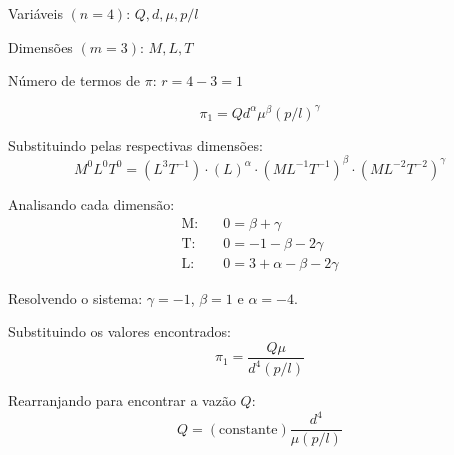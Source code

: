 Variáveis $(n=4)$: $Q, d, \mu, p/l$

Dimensões $(m=3)$: $M, L, T$

Número de termos de $\pi$: $r = 4 - 3 = 1$

\[ \pi_1 = Q d^\alpha \mu^\beta (p/l)^\gamma \]

Substituindo pelas respectivas dimensões:
\[ M^{0}L^{0}T^{0} = (L^{3}T^{-1}) \cdot (L)^{\alpha} \cdot (M L^{-1}T^{-1})^{\beta} \cdot (M L^{-2}T^{-2})^\gamma \]

Analisando cada dimensão:
\begin{align*}
\text{M:} \quad & 0 = \beta + \gamma \\
\text{T:} \quad & 0 = -1 - \beta - 2\gamma \\
\text{L:} \quad & 0 = 3 + \alpha - \beta - 2\gamma
\end{align*}

Resolvendo o sistema: $\gamma = -1$, $\beta = 1$ e $\alpha = -4$.

Substituindo os valores encontrados:
\[ \pi_1 = \frac{Q\mu}{d^4 (p/l)} \]

Rearranjando para encontrar a vazão $Q$:
\[ Q = (\text{constante}) \frac{d^{4}}{\mu(p/l)} \]